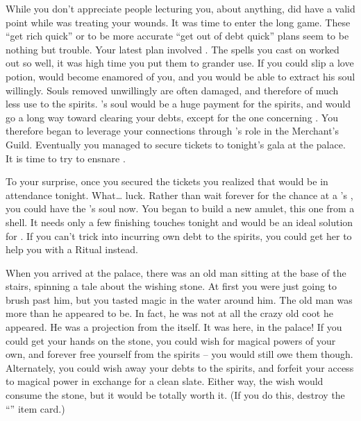 \documentclass[char]{NeptuneBall}
\begin{document}
While you don't appreciate people lecturing you, about anything, \cManta{} did have a valid point while \cManta{\they} was treating your wounds. It was time to enter the long game. These ``get rich quick'' or to be more accurate ``get out of debt quick'' plans seem to be nothing but trouble. Your latest plan involved \cKing{\King} \cKing{}. The spells you cast on \cSlave{} worked out so well, it was high time you put them to grander use. If you could slip \cKing{} a love potion, \cKing{} would become enamored of you, and you would be able to extract his soul willingly. Souls removed unwillingly are often damaged, and therefore of much less use to the spirits. \cKing{}'s soul would be a huge payment for the spirits, and would go a long way toward clearing your debts, except for the one concerning \cAriel{}. You therefore began to leverage your connections through \cSlave{}'s role in the Merchant's Guild. Eventually you managed to secure tickets to tonight's gala at the palace. It is time to try to ensnare \cKing{}.

To your surprise, once you secured the tickets you realized that \cAriel{\King} \cAriel{} would be in attendance tonight. What\ldots{} luck. Rather than wait forever for the chance at a \cAriel{}'s \cArielsSon{\offspring}, you could have the \cAriel{\parent}'s soul now. You began to build a new amulet, this one from a shell. It needs only a few finishing touches tonight and would be an ideal solution for \cAriel{}. If you can't trick \cAriel{} into incurring \cAriel{\their} own debt to the spirits, you could get her to help you with a \gRitual{} Ritual instead.

When you arrived at the palace, there was an old man sitting at the base of the stairs, spinning a tale about the wishing stone. At first you were just going to brush past him, but you tasted magic in the water around him. The old man was more than he appeared to be. In fact, he was not at all the crazy old coot he appeared. He was a projection from the \iWishingStone{\MYname} itself. It was here, in the palace! If you could get your hands on the stone, you could wish for magical powers of your own, and forever free yourself from the spirits -- you would still owe them though. Alternately, you could wish away your debts to the spirits, and forfeit your access to magical power in exchange for a clean slate. Either way, the wish would consume the stone, but it would be totally worth it. (If you do this, destroy the ``\iWishingStone{}'' item card.)
\end{document}
